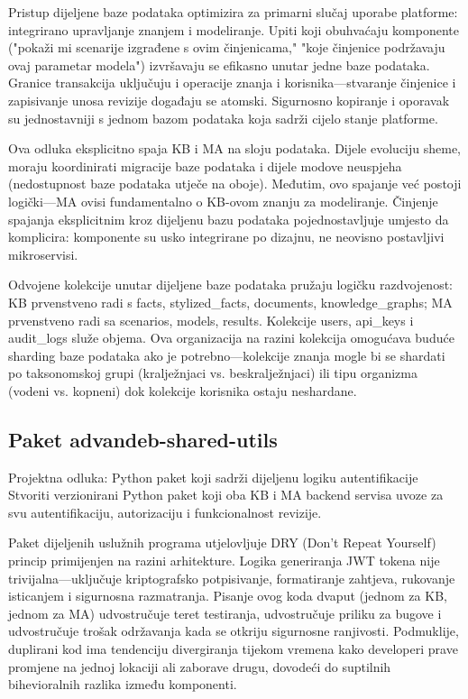 \documentclass[12pt,a4paper]{article}
\begin{document}
Pristup dijeljene baze podataka optimizira za primarni slučaj uporabe platforme: integrirano upravljanje znanjem i modeliranje. Upiti koji obuhvaćaju komponente ("pokaži mi scenarije izgrađene s ovim činjenicama," "koje činjenice podržavaju ovaj parametar modela") izvršavaju se efikasno unutar jedne baze podataka. Granice transakcija uključuju i operacije znanja i korisnika—stvaranje činjenice i zapisivanje unosa revizije događaju se atomski. Sigurnosno kopiranje i oporavak su jednostavniji s jednom bazom podataka koja sadrži cijelo stanje platforme.

Ova odluka eksplicitno spaja KB i MA na sloju podataka. Dijele evoluciju sheme, moraju koordinirati migracije baze podataka i dijele modove neuspjeha (nedostupnost baze podataka utječe na oboje). Međutim, ovo spajanje već postoji logički—MA ovisi fundamentalno o KB-ovom znanju za modeliranje. Činjenje spajanja eksplicitnim kroz dijeljenu bazu podataka pojednostavljuje umjesto da komplicira: komponente su usko integrirane po dizajnu, ne neovisno postavljivi mikroservisi.

Odvojene kolekcije unutar dijeljene baze podataka pružaju logičku razdvojenost: KB prvenstveno radi s facts, stylized\_facts, documents, knowledge\_graphs; MA prvenstveno radi sa scenarios, models, results. Kolekcije users, api\_keys i audit\_logs služe objema. Ova organizacija na razini kolekcija omogućava buduće sharding baze podataka ako je potrebno—kolekcije znanja mogle bi se shardati po taksonomskoj grupi (kralježnjaci vs. beskralježnjaci) ili tipu organizma (vodeni vs. kopneni) dok kolekcije korisnika ostaju neshardane.

\subsection{Paket advandeb-shared-utils}

\begin{rationale}{Projektna odluka: Python paket koji sadrži dijeljenu logiku autentifikacije}
Stvoriti verzionirani Python paket koji oba KB i MA backend servisa uvoze za svu autentifikaciju, autorizaciju i funkcionalnost revizije.
\end{rationale}

Paket dijeljenih uslužnih programa utjelovljuje DRY (Don't Repeat Yourself) princip primijenjen na razini arhitekture. Logika generiranja JWT tokena nije trivijalna—uključuje kriptografsko potpisivanje, formatiranje zahtjeva, rukovanje isticanjem i sigurnosna razmatranja. Pisanje ovog koda dvaput (jednom za KB, jednom za MA) udvostručuje teret testiranja, udvostručuje priliku za bugove i udvostručuje trošak održavanja kada se otkriju sigurnosne ranjivosti. Podmuklije, duplirani kod ima tendenciju divergiranja tijekom vremena kako developeri prave promjene na jednoj lokaciji ali zaborave drugu, dovodeći do suptilnih bihevioralnih razlika između komponenti.
\end{document}

